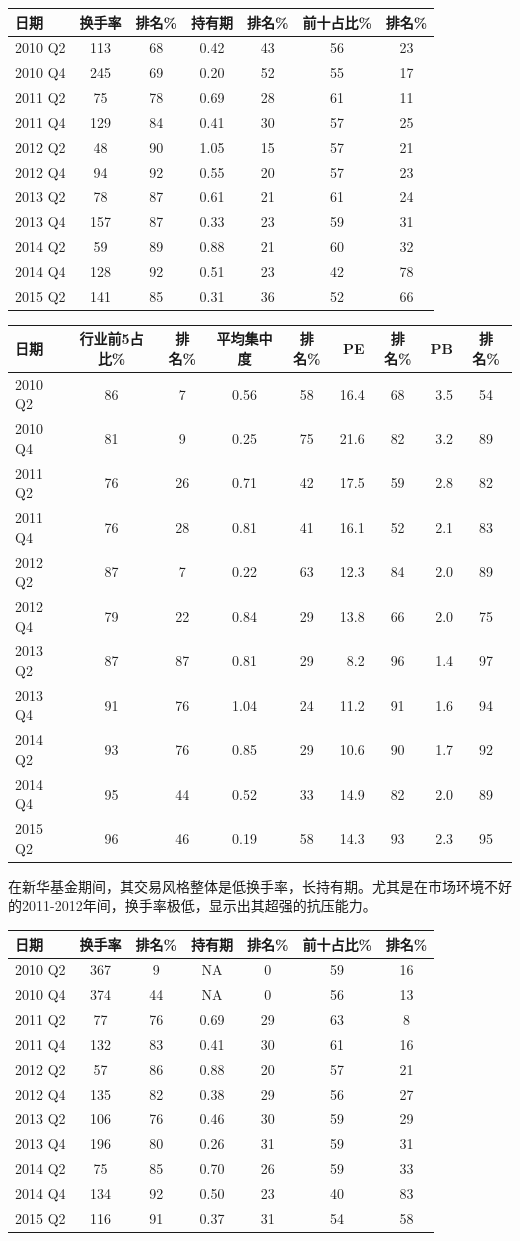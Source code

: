\documentclass[hyperref,]{ctexart}
\begin{document}
\begin{longtable}[]{@{}lcccccc@{}}
\toprule
日期 & 换手率 & 排名\% & 持有期 & 排名\% & 前十占比\% &
排名\%\tabularnewline
\midrule
\endhead
2010 Q2 & 113 & 68 & 0.42 & 43 & 56 & 23\tabularnewline
2010 Q4 & 245 & 69 & 0.20 & 52 & 55 & 17\tabularnewline
2011 Q2 & 75 & 78 & 0.69 & 28 & 61 & 11\tabularnewline
2011 Q4 & 129 & 84 & 0.41 & 30 & 57 & 25\tabularnewline
2012 Q2 & 48 & 90 & 1.05 & 15 & 57 & 21\tabularnewline
2012 Q4 & 94 & 92 & 0.55 & 20 & 57 & 23\tabularnewline
2013 Q2 & 78 & 87 & 0.61 & 21 & 61 & 24\tabularnewline
2013 Q4 & 157 & 87 & 0.33 & 23 & 59 & 31\tabularnewline
2014 Q2 & 59 & 89 & 0.88 & 21 & 60 & 32\tabularnewline
2014 Q4 & 128 & 92 & 0.51 & 23 & 42 & 78\tabularnewline
2015 Q2 & 141 & 85 & 0.31 & 36 & 52 & 66\tabularnewline
\bottomrule
\end{longtable}

\begin{longtable}[]{@{}lccccrcrc@{}}
\toprule
日期 & 行业前5占比\% & 排名\% & 平均集中度 & 排名\% & PE & 排名\% & PB &
排名\%\tabularnewline
\midrule
\endhead
2010 Q2 & 86 & 7 & 0.56 & 58 & 16.4 & 68 & 3.5 & 54\tabularnewline
2010 Q4 & 81 & 9 & 0.25 & 75 & 21.6 & 82 & 3.2 & 89\tabularnewline
2011 Q2 & 76 & 26 & 0.71 & 42 & 17.5 & 59 & 2.8 & 82\tabularnewline
2011 Q4 & 76 & 28 & 0.81 & 41 & 16.1 & 52 & 2.1 & 83\tabularnewline
2012 Q2 & 87 & 7 & 0.22 & 63 & 12.3 & 84 & 2.0 & 89\tabularnewline
2012 Q4 & 79 & 22 & 0.84 & 29 & 13.8 & 66 & 2.0 & 75\tabularnewline
2013 Q2 & 87 & 87 & 0.81 & 29 & 8.2 & 96 & 1.4 & 97\tabularnewline
2013 Q4 & 91 & 76 & 1.04 & 24 & 11.2 & 91 & 1.6 & 94\tabularnewline
2014 Q2 & 93 & 76 & 0.85 & 29 & 10.6 & 90 & 1.7 & 92\tabularnewline
2014 Q4 & 95 & 44 & 0.52 & 33 & 14.9 & 82 & 2.0 & 89\tabularnewline
2015 Q2 & 96 & 46 & 0.19 & 58 & 14.3 & 93 & 2.3 & 95\tabularnewline
\bottomrule
\end{longtable}

在新华基金期间，其交易风格整体是低换手率，长持有期。尤其是在市场环境不好的2011-2012年间，换手率极低，显示出其超强的抗压能力。

\begin{longtable}[]{@{}lcccccc@{}}
\toprule
日期 & 换手率 & 排名\% & 持有期 & 排名\% & 前十占比\% &
排名\%\tabularnewline
\midrule
\endhead
2010 Q2 & 367 & 9 & NA & 0 & 59 & 16\tabularnewline
2010 Q4 & 374 & 44 & NA & 0 & 56 & 13\tabularnewline
2011 Q2 & 77 & 76 & 0.69 & 29 & 63 & 8\tabularnewline
2011 Q4 & 132 & 83 & 0.41 & 30 & 61 & 16\tabularnewline
2012 Q2 & 57 & 86 & 0.88 & 20 & 57 & 21\tabularnewline
2012 Q4 & 135 & 82 & 0.38 & 29 & 56 & 27\tabularnewline
2013 Q2 & 106 & 76 & 0.46 & 30 & 59 & 29\tabularnewline
2013 Q4 & 196 & 80 & 0.26 & 31 & 59 & 31\tabularnewline
2014 Q2 & 75 & 85 & 0.70 & 26 & 59 & 33\tabularnewline
2014 Q4 & 134 & 92 & 0.50 & 23 & 40 & 83\tabularnewline
2015 Q2 & 116 & 91 & 0.37 & 31 & 54 & 58\tabularnewline
\bottomrule
\end{longtable}
\end{document}
